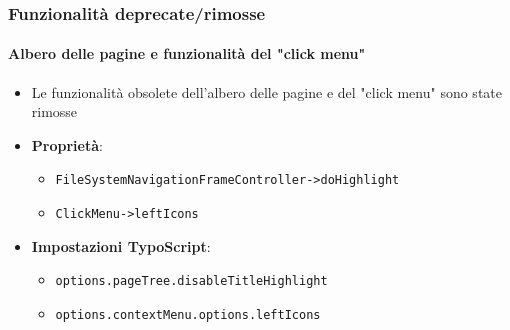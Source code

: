 
\begin{frame}[fragile]
	\frametitle{Funzionalità deprecate/rimosse}
	\framesubtitle{Albero delle pagine e funzionalità del "click menu"}

	\begin{itemize}

		\item Le funzionalità obsolete dell'albero delle pagine e del "click menu" sono state rimosse
		\item \textbf{Proprietà}:

		\begin{itemize}
			\item \texttt{FileSystemNavigationFrameController->doHighlight}
			\item \texttt{ClickMenu->leftIcons}
		\end{itemize}

		\item \textbf{Impostazioni TypoScript}:

		\begin{itemize}
			\item \texttt{options.pageTree.disableTitleHighlight}
			\item \texttt{options.contextMenu.options.leftIcons}
		\end{itemize}

	\end{itemize}

\end{frame}


